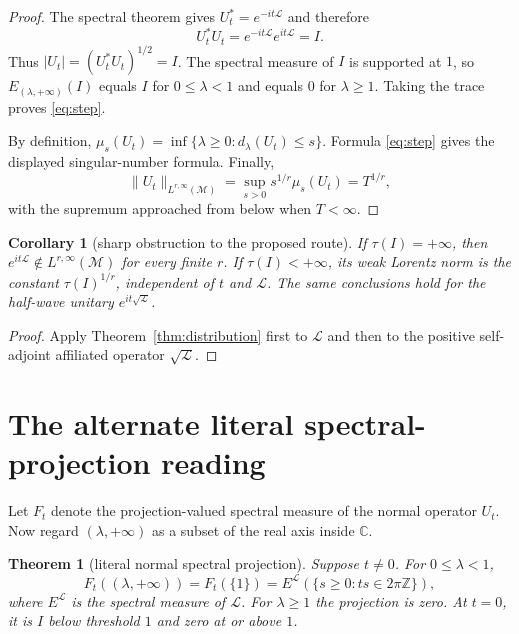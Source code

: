 \documentclass[11pt]{article}
\newtheorem{theorem}{Theorem}
\newtheorem{corollary}{Corollary}
\newcommand{\M}{\mathcal M}
\newcommand{\Lcal}{\mathcal L}
\begin{document}
\begin{proof}
The spectral theorem gives $U_t^*=e^{-it\Lcal}$ and therefore
\[
 U_t^*U_t=e^{-it\Lcal}e^{it\Lcal}=I.
\]
Thus $|U_t|=(U_t^*U_t)^{1/2}=I$.  The spectral measure of $I$ is supported at
$1$, so $E_{(\lambda,+\infty)}(I)$ equals $I$ for $0\le\lambda<1$ and equals
$0$ for $\lambda\ge1$.  Taking the trace proves \eqref{eq:step}.

By definition,
$\mu_s(U_t)=\inf\{\lambda\ge0:d_\lambda(U_t)\le s\}$.  Formula
\eqref{eq:step} gives the displayed singular-number formula.  Finally,
\[
 \|U_t\|_{L^{r,\infty}(\M)}
 =\sup_{s>0}s^{1/r}\mu_s(U_t)=T^{1/r},
\]
with the supremum approached from below when $T<\infty$.
\end{proof}

\begin{corollary}[sharp obstruction to the proposed route]\label{cor:route}
If $\tau(I)=+\infty$, then $e^{it\Lcal}\notin L^{r,\infty}(\M)$ for every
finite $r$.  If $\tau(I)<+\infty$, its weak Lorentz norm is the constant
$\tau(I)^{1/r}$, independent of $t$ and $\Lcal$.  The same conclusions hold
for the half-wave unitary $e^{it\sqrt{\Lcal}}$.
\end{corollary}

\begin{proof}
Apply Theorem~\ref{thm:distribution} first to $\Lcal$ and then to the positive
self-adjoint affiliated operator $\sqrt{\Lcal}$.
\end{proof}

\section{The alternate literal spectral-projection reading}

Let $F_t$ denote the projection-valued spectral measure of the normal
operator $U_t$.  Now regard $(\lambda,+\infty)$ as a subset of the real axis
inside $\mathbb C$.

\begin{theorem}[literal normal spectral projection]\label{thm:literal}
Suppose $t\ne0$.  For $0\le\lambda<1$,
\begin{equation}\label{eq:resonance}
 F_t((\lambda,+\infty))
 =F_t(\{1\})
 =E^{\Lcal}\!\left(\{s\ge0:ts\in2\pi\mathbb Z\}\right),
\end{equation}
where $E^{\Lcal}$ is the spectral measure of $\Lcal$.  For $\lambda\ge1$ the
projection is zero.  At $t=0$, it is $I$ below threshold $1$ and zero at or
above $1$.
\end{theorem}
\end{document}
